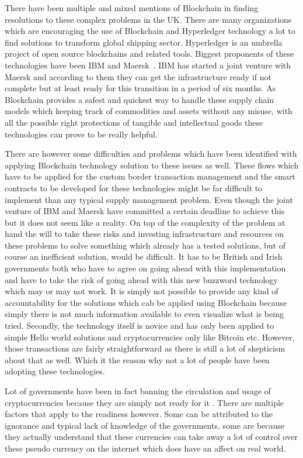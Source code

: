 There have been multiple and mixed mentions of Blockchain in finding
resolutions to these complex problems in the UK. There are many
organizations which are encouraging the use of Blockchain and
Hyperledger technology a lot to find solutions to transform global
shipping sector. Hyperledger is an umbrella project of open source
blockchains and related tools. Biggest proponents of these
technologies have been IBM and Maersk~\cite{stratfor1}. IBM has
started a joint venture with Maersk and according to them they can get
the infrastructure ready if not complete but at least ready for this
transition in a period of six months. As Blockchain provides a safest
and quickest way to handle these supply chain models which keeping
track of commodities and assets without any misuse, with all the
possible right protections of tangible and intellectual goods these
technologies can prove to be really helpful.

There are however some difficulties and problems which have been
identified with applying Blockchain technology solution to these
issues as well. These flows which have to be applied for the custom
border transaction management and the smart contracts to be developed
for these technologies might be far difficult to implement than any
typical supply management problem. Even though the joint venture of
IBM and Maersk have committed a certain deadline to achieve this but
it does not seem like a reality. On top of the complexity of the
problem at hand the will to take these risks and investing
infrastructure and resources on these problems to solve something
which already has a tested solutions, but of course an inefficient
solution, would be difficult. It has to be British and Irish
governments both who have to agree on going ahead with this
implementation and have to take the risk of going ahead with this new
buzzword technology which may or may not work. It is simply not
possible to provide any kind of accountability for the solutions which
cab be applied using Blockchain because simply there is not much
information available to even visualize what is being tried. Secondly,
the technology itself is novice and has only been applied to simple
Hello world solutions and cryptocurrencies only like Bitcoin etc.
However, those transactions are fairly straightforward as there is
still a lot of skepticism about that as well. Which it the reason why
not a lot of people have been adopting these technologies.

Lot of governments have been in fact banning the circulation and usage
of cryptocurrencies because they are simply not ready for it
\cite{kate2}. There are multiple factors that apply to the readiness
however. Some can be attributed to the ignorance and typical lack of
knowledge of the governments, some are because they actually
understand that these currencies can take away a lot of control over
these pseudo currency on the internet which does have an affect on
real world.

